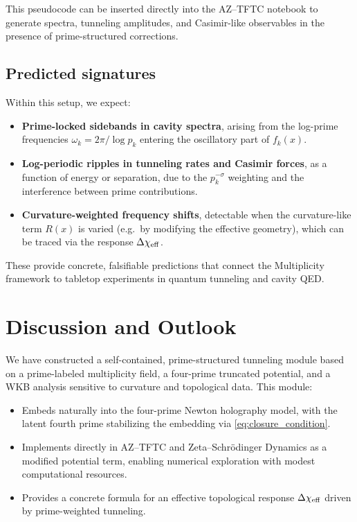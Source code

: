 \documentclass[11pt]{article}
\begin{document}
This pseudocode can be inserted directly into the AZ--TFTC notebook to
generate spectra, tunneling amplitudes, and Casimir-like observables in
the presence of prime-structured corrections.

\subsection{Predicted signatures}

Within this setup, we expect:
\begin{itemize}
  \item \textbf{Prime-locked sidebands in cavity spectra}, arising from
  the log-prime frequencies \(\omega_k = 2\pi/\log p_k\) entering the
  oscillatory part of \(f_k(x)\).
  \item \textbf{Log-periodic ripples in tunneling rates and Casimir
  forces}, as a function of energy or separation, due to the
  \(p_k^{-\sigma}\) weighting and the interference between prime
  contributions.
  \item \textbf{Curvature-weighted frequency shifts}, detectable when
  the curvature-like term \(R(x)\) is varied (e.g.\ by modifying the
  effective geometry), which can be traced via the response
  \(\Delta\chi_{\rm eff}\).
\end{itemize}
These provide concrete, falsifiable predictions that connect the
Multiplicity framework to tabletop experiments in quantum tunneling and
cavity QED.\cite{tunneling_topology_draft,AZ_TFTC_draft,zeta_schrodinger_draft}

\section{Discussion and Outlook}

We have constructed a self-contained, prime-structured tunneling module
based on a prime-labeled multiplicity field, a four-prime truncated
potential, and a WKB analysis sensitive to curvature and topological
data. This module:
\begin{itemize}
  \item Embeds naturally into the four-prime Newton holography model,
  with the latent fourth prime stabilizing the embedding via
  \eqref{eq:closure_condition}.
  \item Implements directly in AZ--TFTC and Zeta--Schr\"odinger Dynamics
  as a modified potential term, enabling numerical exploration with
  modest computational resources.
  \item Provides a concrete formula for an effective topological
  response \(\Delta\chi_{\rm eff}\) driven by prime-weighted tunneling.
\end{itemize}
\end{document}
